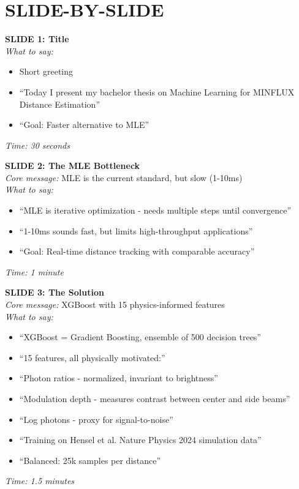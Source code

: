 \documentclass[a4paper,10pt]{article}
\begin{document}
\section*{SLIDE-BY-SLIDE}

\begin{mdframed}[style=karte]
\textbf{SLIDE 1: Title}\\[5pt]
\textit{What to say:}
\begin{itemize}[leftmargin=*, nosep]
    \item Short greeting
    \item ``Today I present my bachelor thesis on Machine Learning for MINFLUX Distance Estimation''
    \item ``Goal: Faster alternative to MLE''
\end{itemize}
\textit{Time: 30 seconds}
\end{mdframed}

\begin{mdframed}[style=karte]
\textbf{SLIDE 2: The MLE Bottleneck}\\[5pt]
\textit{Core message:} MLE is the current standard, but slow (1-10ms)\\[5pt]
\textit{What to say:}
\begin{itemize}[leftmargin=*, nosep]
    \item ``MLE is iterative optimization - needs multiple steps until convergence''
    \item ``1-10ms sounds fast, but limits high-throughput applications''
    \item ``Goal: Real-time distance tracking with comparable accuracy''
\end{itemize}
\textit{Time: 1 minute}
\end{mdframed}

\begin{mdframed}[style=karte]
\textbf{SLIDE 3: The Solution}\\[5pt]
\textit{Core message:} XGBoost with 15 physics-informed features\\[5pt]
\textit{What to say:}
\begin{itemize}[leftmargin=*, nosep]
    \item ``XGBoost = Gradient Boosting, ensemble of 500 decision trees''
    \item ``15 features, all physically motivated:''
    \item ``Photon ratios - normalized, invariant to brightness''
    \item ``Modulation depth - measures contrast between center and side beams''
    \item ``Log photons - proxy for signal-to-noise''
    \item ``Training on Hensel et al. Nature Physics 2024 simulation data''
    \item ``Balanced: 25k samples per distance''
\end{itemize}
\textit{Time: 1.5 minutes}
\end{mdframed}
\end{document}
